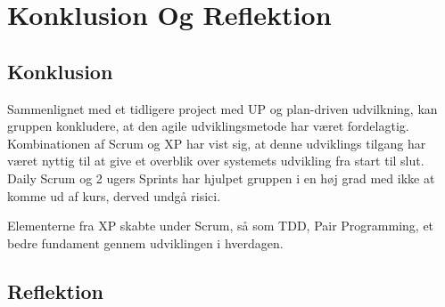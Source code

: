 \chapter{Konklusion Og Reflektion}\label{ch:KonklusionReflektion}

\section{Konklusion}


Sammenlignet med et tidligere project med UP og plan-driven udvilkning, kan gruppen konkludere, at den agile udviklingsmetode har været fordelagtig. Kombinationen af Scrum og XP har vist sig, at denne udviklings tilgang har været nyttig til at give et overblik over systemets udvikling fra start til slut. Daily Scrum og 2 ugers Sprints har hjulpet gruppen i en høj grad med ikke at komme ud af kurs, derved undgå risici. 

 Elementerne fra XP skabte under Scrum, så som TDD, Pair Programming, et bedre fundament gennem udviklingen i hverdagen. 



\section{Reflektion}